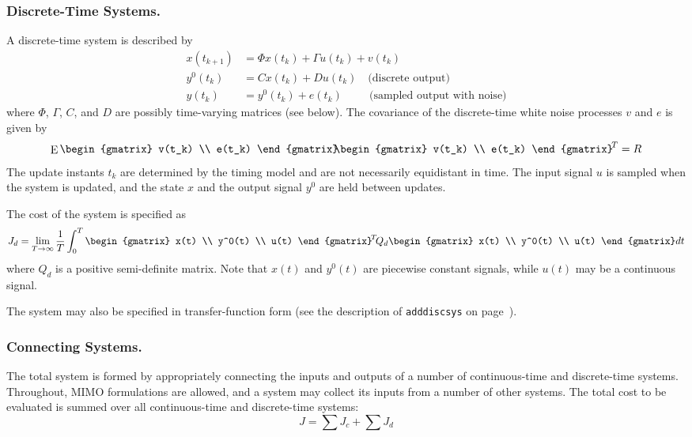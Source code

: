 \documentclass[final,twoside]{rapport}  %
\DeclareMathOperator{\E}{E}
\begin{document}
\subsubsection{Discrete-Time Systems.}
A discrete-time system is described by
\[
\begin{aligned}
x(t_{k+1}) &= \Phi x(t_k) + \Gamma u (t_k) + v(t_k) \\
y^0(t_k) &= C x(t_k) + D u(t_k) \quad \text{(discrete output)}\\
y(t_k) &= y^0(t_k) + e(t_k) \qquad \;\, \text{(sampled output with noise)}
\end{aligned}
\]
where $\Phi$, $\Gamma$, $C$, and $D$ are possibly time-varying matrices (see
below). The covariance of the discrete-time white noise processes
$v$ and $e$ is given by
\[
\E \begin{gmatrix} v(t_k) \\ e(t_k) \end{gmatrix} \!\!
\begin{gmatrix} v(t_k)
  \\ e(t_k) \end{gmatrix}^{\!T} = R
\]
The update instants $t_k$ are determined by the timing model and are
not necessarily equidistant in time. The input signal $u$ is
sampled when the system is updated, and the state $x$ and the output
signal $y^0$ are held between updates.

The cost of the system is specified as  
\[
J_d = \lim_{T \rightarrow \infty} \frac{1}{T} \int_0^T
  \begin{gmatrix} x(t) \\ y^0(t) \\ u(t) \end{gmatrix}^{\!T} \! Q_d
  \begin{gmatrix} x(t) \\ y^0(t) \\ u(t) \end{gmatrix} dt
\]
where $Q_d$ is a positive semi-definite matrix. Note that $x(t)$ and
$y^0(t)$ are piecewise constant signals, while $u(t)$ may be a continuous
signal. 

The system may also be specified in transfer-function form (see the
description of {\tt   adddiscsys} on page~\pageref{sec:adddiscsys}).

\subsubsection{Connecting Systems.}
The total system is formed by appropriately connecting the
inputs and outputs of a number of continuous-time and discrete-time
systems. Throughout, MIMO formulations are allowed, and a system may
collect its inputs from a number of other systems. The total cost to
be evaluated is summed over all continuous-time and discrete-time
systems:
\begin{equation}
\label{eq:totcost}
J = \sum J_c +  \sum J_d
\end{equation}
\end{document}
